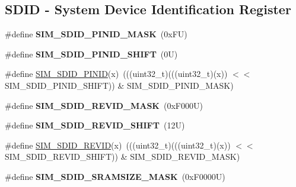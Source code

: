 \subsection*{S\+D\+ID -\/ System Device Identification Register}
\begin{DoxyCompactItemize}
\item 
\mbox{\label{group___s_i_m___register___masks_gaf0820acb74ce8270da2025fee624b47c}} 
\#define {\bfseries S\+I\+M\+\_\+\+S\+D\+I\+D\+\_\+\+P\+I\+N\+I\+D\+\_\+\+M\+A\+SK}~(0x\+F\+U)
\item 
\mbox{\label{group___s_i_m___register___masks_ga593faac0d0629fde52f6fe4b83614c23}} 
\#define {\bfseries S\+I\+M\+\_\+\+S\+D\+I\+D\+\_\+\+P\+I\+N\+I\+D\+\_\+\+S\+H\+I\+FT}~(0\+U)
\item 
\#define \mbox{\hyperlink{group___s_i_m___register___masks_ga64447ab3209ba3103c4d452b56c405a1}{S\+I\+M\+\_\+\+S\+D\+I\+D\+\_\+\+P\+I\+N\+ID}}(x)~(((uint32\+\_\+t)(((uint32\+\_\+t)(x)) $<$$<$ S\+I\+M\+\_\+\+S\+D\+I\+D\+\_\+\+P\+I\+N\+I\+D\+\_\+\+S\+H\+I\+FT)) \& S\+I\+M\+\_\+\+S\+D\+I\+D\+\_\+\+P\+I\+N\+I\+D\+\_\+\+M\+A\+SK)
\item 
\mbox{\label{group___s_i_m___register___masks_gafefd91d0385c1b93049ec14409ed6b1e}} 
\#define {\bfseries S\+I\+M\+\_\+\+S\+D\+I\+D\+\_\+\+R\+E\+V\+I\+D\+\_\+\+M\+A\+SK}~(0x\+F000\+U)
\item 
\mbox{\label{group___s_i_m___register___masks_gadb535428e0ca83d2494493ed04822b8c}} 
\#define {\bfseries S\+I\+M\+\_\+\+S\+D\+I\+D\+\_\+\+R\+E\+V\+I\+D\+\_\+\+S\+H\+I\+FT}~(12\+U)
\item 
\#define \mbox{\hyperlink{group___s_i_m___register___masks_gac72e070db07acc8b7964eb21ab91272f}{S\+I\+M\+\_\+\+S\+D\+I\+D\+\_\+\+R\+E\+V\+ID}}(x)~(((uint32\+\_\+t)(((uint32\+\_\+t)(x)) $<$$<$ S\+I\+M\+\_\+\+S\+D\+I\+D\+\_\+\+R\+E\+V\+I\+D\+\_\+\+S\+H\+I\+FT)) \& S\+I\+M\+\_\+\+S\+D\+I\+D\+\_\+\+R\+E\+V\+I\+D\+\_\+\+M\+A\+SK)
\item 
\mbox{\label{group___s_i_m___register___masks_gaedb71533a342dcb2cc83241898378b70}} 
\#define {\bfseries S\+I\+M\+\_\+\+S\+D\+I\+D\+\_\+\+S\+R\+A\+M\+S\+I\+Z\+E\+\_\+\+M\+A\+SK}~(0x\+F0000\+U)
\item 

\end{DoxyCompactItemize}
